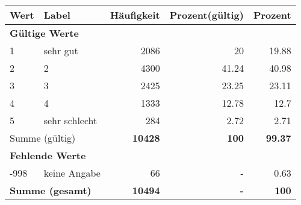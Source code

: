      \begin{longtable}{lXrrr}
     \toprule
     \textbf{Wert} & \textbf{Label} & \textbf{Häufigkeit} & \textbf{Prozent(gültig)} & \textbf{Prozent} \\
     \endhead
     \midrule
     \multicolumn{5}{l}{\textbf{Gültige Werte}}\\

     1 &
     \multicolumn{1}{X}{ sehr gut   } &


       \num{2086} &
       \num[round-mode=places,round-precision=2]{20} &
         \num[round-mode=places,round-precision=2]{19.88} \\

     2 &
     \multicolumn{1}{X}{ 2   } &


       \num{4300} &
       \num[round-mode=places,round-precision=2]{41.24} &
         \num[round-mode=places,round-precision=2]{40.98} \\

     3 &
     \multicolumn{1}{X}{ 3   } &


       \num{2425} &
       \num[round-mode=places,round-precision=2]{23.25} &
         \num[round-mode=places,round-precision=2]{23.11} \\

     4 &
     \multicolumn{1}{X}{ 4   } &


       \num{1333} &
       \num[round-mode=places,round-precision=2]{12.78} &
         \num[round-mode=places,round-precision=2]{12.7} \\

     5 &
     \multicolumn{1}{X}{ sehr schlecht   } &


       \num{284} &
       \num[round-mode=places,round-precision=2]{2.72} &
         \num[round-mode=places,round-precision=2]{2.71} \\
     \midrule
     \multicolumn{2}{l}{Summe (gültig)} &
       \textbf{\num{10428}} &
     \textbf{\num{100}} &
       \textbf{\num[round-mode=places,round-precision=2]{99.37}} \\
     \multicolumn{5}{l}{\textbf{Fehlende Werte}}\\
       -998 &
       keine Angabe &
         \num{66} &
        - &
         \num[round-mode=places,round-precision=2]{0.63} \\
     \midrule
     \multicolumn{2}{l}{\textbf{Summe (gesamt)}} &
          \textbf{\num{10494}} &
        \textbf{-} &
        \textbf{\num{100}} \\
     \bottomrule
     \end{longtable}
     
